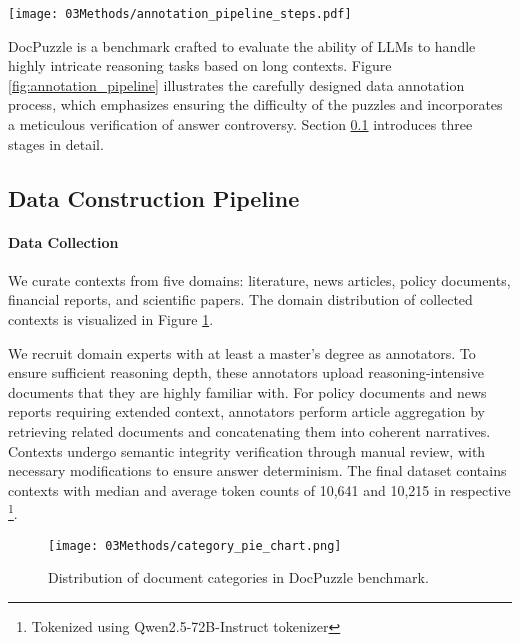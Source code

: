 
\begin{figure*}
    \centering
    \texttt{[image: 03Methods/annotation\_pipeline\_steps.pdf]}
    \caption{Overview of DocPuzzle construction pipeline. There are five stages before the samples are included in the benchmark.}
    \label{fig:annotation_pipeline}
\end{figure*}
DocPuzzle is a benchmark crafted to evaluate the ability of LLMs to handle highly intricate reasoning tasks based on long contexts. 
Figure \ref{fig:annotation_pipeline} illustrates the carefully designed data annotation process, which emphasizes ensuring the difficulty of the puzzles and incorporates a meticulous verification of answer controversy. 
Section \ref{sub:pipeline} introduces three stages in detail.


\subsection{Data Construction Pipeline}\label{sub:pipeline}

\paragraph{Data Collection}
We curate contexts from five domains: literature, news articles, policy documents, financial reports, and scientific papers.
The domain distribution of collected contexts is visualized in Figure \ref{fig:context_distribution}.

We recruit domain experts with at least a master's degree as annotators. To ensure sufficient reasoning depth, these annotators upload reasoning-intensive documents that they are highly familiar with. 
For policy documents and news reports requiring extended context, annotators perform article aggregation by retrieving related documents and concatenating them into coherent narratives. 
Contexts undergo semantic integrity verification through manual review, with necessary modifications to ensure answer determinism. 
The final dataset contains contexts with median and average token counts of 10,641 and 10,215 in respective \footnote{Tokenized using Qwen2.5-72B-Instruct tokenizer}.


\begin{figure}
    \centering
    \texttt{[image: 03Methods/category\_pie\_chart.png]}
    \caption{Distribution of document categories in DocPuzzle benchmark.}
    \label{fig:context_distribution}
\end{figure}

